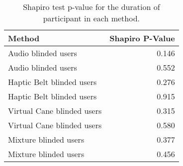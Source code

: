 
\begin{table}[!htb]
\centering
\caption{Shapiro test p-value for the duration of participant in each method.}
\label{tab:shapiro_duration}
\begin{tabular}{lr}
\toprule
                    Method &  Shapiro P-Value \\
\midrule
       Audio blinded users &            0.146 \\
       Audio blinded users &            0.552 \\
 Haptic Belt blinded users &            0.276 \\
 Haptic Belt blinded users &            0.915 \\
Virtual Cane blinded users &            0.315 \\
Virtual Cane blinded users &            0.580 \\
     Mixture blinded users &            0.377 \\
     Mixture blinded users &            0.456 \\
\bottomrule
\end{tabular}
\end{table}

